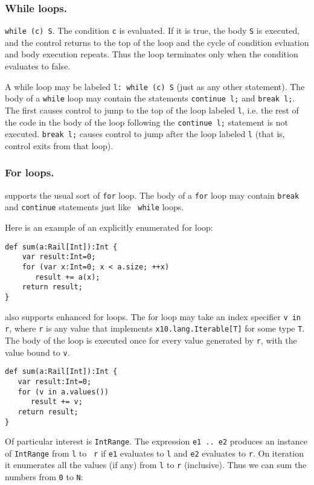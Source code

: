 \subsubsection{While loops.} {\tt while (c) S}. The condition {\tt c} is
 evaluated. If it is true, the body {\tt S} is executed, and the
 control returns to the top of the loop and the cycle of condition
 evluation and body execution repeats. Thus the loop terminates only
 when the condition evaluates to false.

 A while loop may be labeled {\tt l: while (c) S} (just as any other
 statement). The body of a {\tt while} loop may contain the statements
 {\tt continue l;} and {\tt break l;}. The first causes control to
 jump to the top of the loop labeled {\tt l}, i.e. the rest of the
 code in the body of the loop following the {\tt continue l;}
 statement is not executed. {\tt break l;} causes control to jump
 after the loop labeled {\tt l} (that is, control exits from that
 loop).

\subsubsection{For loops.}
\Xten{} supports the usual sort of {\tt for} loop.
The body of a {\tt for} loop
may contain {\tt break} and {\tt continue} statements just like {\tt
while} loops.

Here is an example of an explicitly enumerated for loop:
{\footnotesize
\begin{verbatim}
def sum(a:Rail[Int]):Int {
    var result:Int=0;
    for (var x:Int=0; x < a.size; ++x)
       result += a(x);
    return result;
}
\end{verbatim}}

\Xten{} also supports enhanced for loops.
The for loop may take an index specifier {\tt v in r}, where {\tt r}
is any value that implements {\tt x10.lang.Iterable[T]} for some type
{\tt T}. The body of the loop is executed once for every value
generated by {\tt r}, with the value bound to {\tt v}. 

{\footnotesize
\begin{verbatim}
def sum(a:Rail[Int]):Int {
   var result:Int=0;
   for (v in a.values())
      result += v;
   return result;
}
\end{verbatim}}

Of particular interest is {\tt IntRange}. The expression {\tt e1
  .. e2} produces an instance of {\tt IntRange} from {\tt l} to {\tt
  r} if {\tt e1} evaluates to {\tt l} and {\tt e2}
evaluates to {\tt r}. On iteration it enumerates all the values (if
any) from {\tt l} to {\tt r} (inclusive). Thus we can sum the numbers
from {\tt 0} to {\tt N}:

